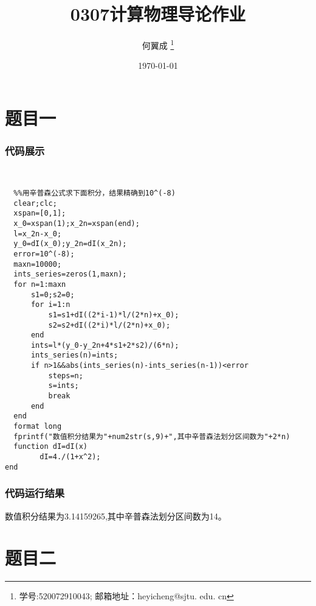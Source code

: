 \documentclass[UTF8,a4paper,10pt]{ctexart}
\title{\textbf{0307计算物理导论作业}}
\author{ 何翼成 \thanks{学号:520072910043; \newline
    邮箱地址：heyicheng@sjtu. edu. cn} }
\date{\today}
\begin{document}
\maketitle


\section{题目一}

\subsubsection{代码展示}

~\\
\lstset{language=matlab}
\begin{lstlisting}
  %%用辛普森公式求下面积分，结果精确到10^(-8)
  clear;clc;
  xspan=[0,1];
  x_0=xspan(1);x_2n=xspan(end);
  l=x_2n-x_0;
  y_0=dI(x_0);y_2n=dI(x_2n);
  error=10^(-8);
  maxn=10000;
  ints_series=zeros(1,maxn);
  for n=1:maxn
      s1=0;s2=0;
      for i=1:n
          s1=s1+dI((2*i-1)*l/(2*n)+x_0);
          s2=s2+dI((2*i)*l/(2*n)+x_0);
      end
      ints=l*(y_0-y_2n+4*s1+2*s2)/(6*n);
      ints_series(n)=ints;
      if n>1&&abs(ints_series(n)-ints_series(n-1))<error
          steps=n;
          s=ints;
          break
      end
  end
  format long
  fprintf("数值积分结果为"+num2str(s,9)+",其中辛普森法划分区间数为"+2*n)
  function dI=dI(x)
        dI=4./(1+x^2);
end
\end{lstlisting}
\subsubsection{代码运行结果}
数值积分结果为3.14159265,其中辛普森法划分区间数为14。\newline

\section{题目二}
\end{document}
